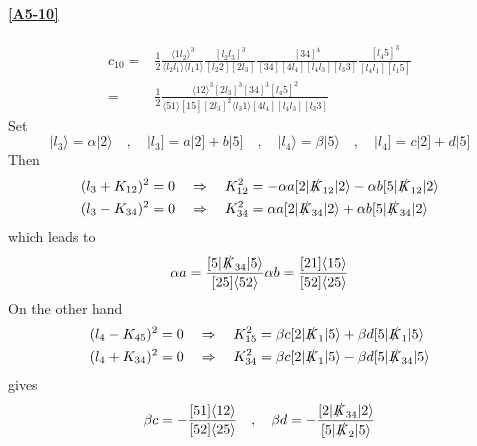 \paragraph{\ref{A5-10}}
\begin{equation*}
\begin{split}
c_{10} = &
\frac{1}{2}\frac{\langle 1l_2\rangle^3}{\langle l_2 l_1 \rangle\langle l_1 1 \rangle}
\frac{[l_2 l_3]^3}{[l_2 2 ][2 l_3]}
\frac{[34]^4}{[34][4 l_4][l_4 l_3][l_3 3]}
\frac{[l_4 5]^3}{[l_4 l_1][l_1 5]}
\\
= &
\frac{1}{2}\frac{\langle 12 \rangle^3[2l_3]^3[34]^3[l_4 5 ]^2}{\langle 51 \rangle[15][2l_3]^2\langle l_3 1\rangle [4 l_4][l_4 l_3][l_3 3]}
\end{split}
\end{equation*}
Set
\begin{equation*}
|l_3\rangle = \alpha |2\rangle \quad,\quad |l_3] = a|2] + b|5]
\quad,\quad
|l_4\rangle = \beta |5\rangle \quad,\quad |l_4] = c|2]+d|5]
\end{equation*}
Then
\begin{equation*}
\begin{split}
& (l_3 + K_{12})^2 = 0 \quad\Rightarrow\quad K_{12}^2 = - \alpha a [2|\slashed{K}_{12}|2\rangle - \alpha b [5|\slashed{K}_{12}|2\rangle
\\
& (l_3 - K_{34})^2 = 0 \quad\Rightarrow\quad K_{34}^2 = \alpha a [2|\slashed{K}_{34}|2\rangle + \alpha b [5|\slashed{K}_{34}|2\rangle
\end{split}
\end{equation*}
which leads to
\begin{equation*}
\alpha a = \frac{[5|\slashed{K}_{34}|5\rangle}{[25]\langle 52\rangle}
\\
\alpha b = \frac{[21]\langle 15\rangle}{[52]\langle 25\rangle}
\end{equation*}
On the other hand
\begin{equation*}
\begin{split}
& (l_4 - K_{45})^2 = 0 \quad\Rightarrow\quad
K_{15}^2 = \beta c[2|\slashed{K}_1|5\rangle + \beta d [5|\slashed{K}_1|5\rangle
\\
& (l_4 + K_{34})^2 = 0 \quad\Rightarrow\quad
K_{34}^2 = \beta c [2|\slashed{K}_1|5\rangle - \beta d [5|\slashed{K}_{34}|5\rangle
\end{split}
\end{equation*}
gives
\begin{equation*}
\beta c = - \frac{[51]\langle 12 \rangle}{[52]\langle 25 \rangle}
\quad,\quad
\beta d = - \frac{[2| \slashed{K}_{34}|2\rangle}{[5|\slashed{K}_2|5\rangle}
\end{equation*}
